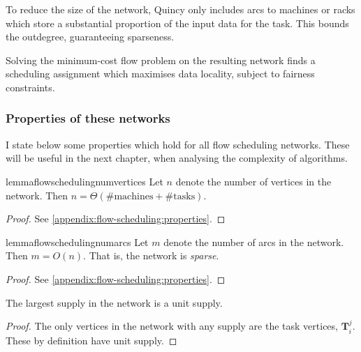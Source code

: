 To reduce the size of the network, Quincy only includes arcs to machines or racks which store a substantial proportion of the input data for the task. This bounds the outdegree, guaranteeing sparseness. 

Solving the minimum-cost flow problem on the resulting network finds a scheduling assignment which maximises data locality, subject to fairness constraints.


\subsubsection{Properties of these networks}


I state below some properties which hold for all flow scheduling networks. These will be useful in the next chapter, when analysing the complexity of algorithms. \\

\begin{restatable}{lemma}{flowschedulingnumvertices}
\label{lemma:network-num-vertices}
Let $n$ denote the number of vertices in the network. Then $n = \Theta\left(\text{\# machines} + \text{\# tasks}\right)$.
\end{restatable}
\begin{proof}
See \cref{appendix:flow-scheduling:properties}.
\end{proof}

\begin{restatable}{lemma}{flowschedulingnumarcs} 
\label{lemma:network-num-arcs}
Let $m$ denote the number of arcs in the network. Then $m = O(n)$. That is, the network is \emph{sparse}.
\end{restatable}
\begin{proof}
See \cref{appendix:flow-scheduling:properties}.
\end{proof}

\begin{lemma} \label{lemma:network-supply}
The largest supply in the network is a unit supply.
\end{lemma}
\begin{proof}
The only vertices in the network with any supply are the task vertices, $\mathbf{T}_i^j$. These by definition have unit supply.
\end{proof}


